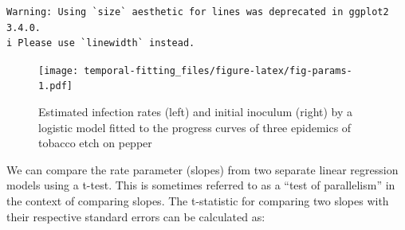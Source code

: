 \documentclass[
  letterpaper,
]{book}
\newenvironment{Shaded}{\begin{snugshade}}{\end{snugshade}}
\newcommand{\AttributeTok}[1]{\textcolor[rgb]{0.40,0.45,0.13}{#1}}
\newcommand{\DecValTok}[1]{\textcolor[rgb]{0.68,0.00,0.00}{#1}}
\newcommand{\FunctionTok}[1]{\textcolor[rgb]{0.28,0.35,0.67}{#1}}
\newcommand{\NormalTok}[1]{\textcolor[rgb]{0.00,0.23,0.31}{#1}}
\newcommand{\OtherTok}[1]{\textcolor[rgb]{0.00,0.23,0.31}{#1}}
\newcommand{\SpecialCharTok}[1]{\textcolor[rgb]{0.37,0.37,0.37}{#1}}
\newcommand{\StringTok}[1]{\textcolor[rgb]{0.13,0.47,0.30}{#1}}
\begin{document}
\begin{verbatim}
Warning: Using `size` aesthetic for lines was deprecated in ggplot2 3.4.0.
i Please use `linewidth` instead.
\end{verbatim}

\begin{Shaded}
\end{Shaded}

\begin{figure}

\texttt{[image: temporal-fitting\_files/figure-latex/fig-params-1.pdf]} \hfill{}

\caption{\label{fig-params}Estimated infection rates (left) and initial
inoculum (right) by a logistic model fitted to the progress curves of
three epidemics of tobacco etch on pepper}

\end{figure}

We can compare the rate parameter (slopes) from two separate linear
regression models using a t-test. This is sometimes referred to as a
``test of parallelism'' in the context of comparing slopes. The
t-statistic for comparing two slopes with their respective standard
errors can be calculated as:
\end{document}
